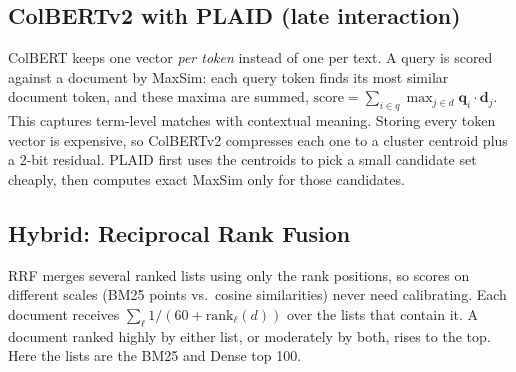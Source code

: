 \subsection{ColBERTv2 with PLAID (late interaction)~\cite{khattab2020colbert,santhanam2022colbertv2,santhanam2022plaid}}
ColBERT keeps one vector \emph{per token} instead of one per text. A query is scored against a
document by MaxSim: each query token finds its most similar document token, and these maxima are
summed, $\mathrm{score}=\sum_{i\in q}\max_{j\in d}\mathbf{q}_i\cdot\mathbf{d}_j$. This captures
term-level matches with contextual meaning. Storing every token vector is expensive, so ColBERTv2
compresses each one to a cluster centroid plus a 2-bit residual. PLAID first uses the centroids to
pick a small candidate set cheaply, then computes exact MaxSim only for those candidates.
\begin{center}\end{center}

\subsection{Hybrid: Reciprocal Rank Fusion~\cite{cormack2009rrf}}
RRF merges several ranked lists using only the rank positions, so scores on different scales
(BM25 points vs.\ cosine similarities) never need calibrating. Each document receives
$\sum_{\ell}1/(60+\mathrm{rank}_\ell(d))$ over the lists that contain it. A document ranked highly
by either list, or moderately by both, rises to the top. Here the lists are the BM25 and Dense top 100.
\begin{center}\end{center}

